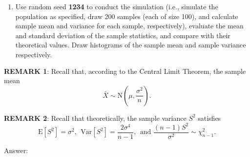 \documentclass[11pt]{article}
\providecommand{\tightlist}{%
      \setlength{\itemsep}{0pt}\setlength{\parskip}{0pt}}
\begin{document}
\begin{enumerate}
\def\labelenumi{\arabic{enumi}.}
\tightlist
\item
  Use random seed \textbf{1234} to conduct the simulation (i.e.,
  simulate the population as specified, draw 200 samples (each of size
  100), and calculate sample mean and variance for each sample,
  respectively), evaluate the mean and standard deviation of the sample
  statistics, and compare with their theoretical values. Draw histograms
  of the sample mean and sample variance respectively.
\end{enumerate}

\textbf{REMARK 1}: Recall that, according to the Central Limit Theorem,
the sample mean
\[\bar{X} \sim  \text{N}\left(\mu, \frac{\sigma^2}{n} \right).\]

\textbf{REMARK 2}: Recall that theoretically, the sample variance
\(S^2\) satisfies
\[\text{E}[S^2] = \sigma^2, ~~ \text{Var}[S^2] = \frac{2 \sigma^4}{n - 1}, ~~\text{and } \frac{(n-1)S^2}{\sigma^2} \sim \chi^2_{n-1}.\]

Answer:
\end{document}
